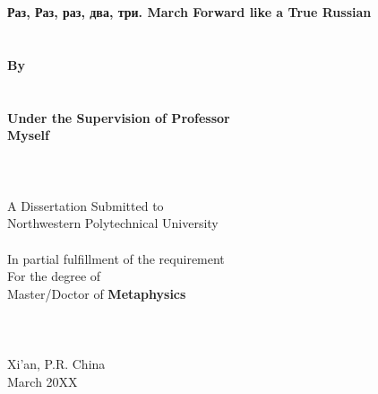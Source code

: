 \begin{titlepage}
	\fTNR
	\begin{spacing}{1.2}
		\begin{center}
			\renewcommand{\baselinestretch}{1.2}
			\renewcommand{\captionfont}{\linespread{1.2}\normalsize}
			\setmainfont{\defaultEngFont}
			\sSanhao ~ \\
			\sSanhao ~ \\
			\fTNR \sErhao \textbf{Раз, Раз, раз, два, три. March Forward like a True Russian}
			\fSong \sXiaoer ~ \\
			\fSong \sXiaoer ~ \\
			\fSong \sXiaoer ~ \\
			\fTNR \sXiaosan \textbf{By}\\
			\fTNR \sXiaosan \textbf{\authorname}\\
			\fSong \sXiaosan ~ \\
			\fTNR \sXiaosan \textbf{Under the Supervision of Professor}\\
			\fTNR \sXiaosan \textbf{Myself}
			\fSong \sSanhao ~ \\
			\fSong \sSanhao ~ \\
			\fSong \sSanhao ~ \\
			\fSong \sSanhao ~ \\
			\fTNR \sXiaosan A Dissertation Submitted to\\
			\fTNR \sXiaosan Northwestern Polytechnical University \\
			\fSong \sSanhao ~ \\
			\fTNR In partial fulfillment of the requirement \\
			\fTNR For the degree of \\
			\fTNR Master/Doctor of \textbf{Metaphysics}
			\fSong \sXiaosan ~ \\
			\fSong \sXiaosan ~ \\
			\fSong \sXiaosan ~ \\
			\fSong \sXiaosan ~ \\
			\fTNR \sXiaosan Xi'an, P.R. China \\
			\fTNR \sXiaosan March 20XX
		\end{center}
	\end{spacing}
\end{titlepage}

\fSong \normalsize

\endinput